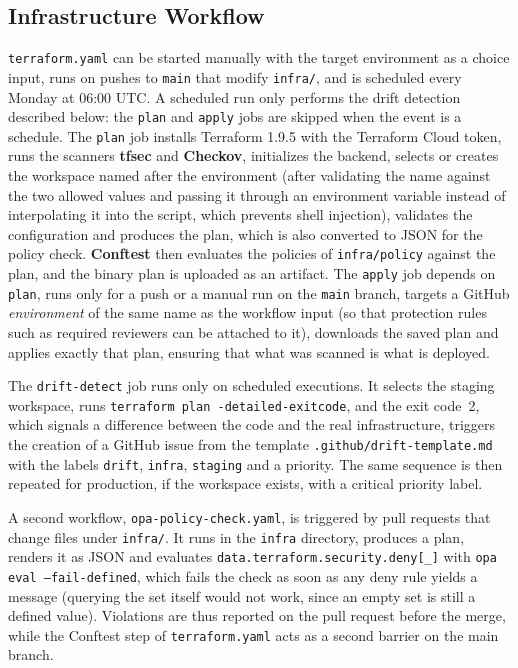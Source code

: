 \subsection{Infrastructure Workflow}

\texttt{terraform.yaml} can be started manually with the target environment as a choice input, runs on pushes to \texttt{main} that modify \texttt{infra/}, and is scheduled every Monday at 06:00 UTC. A scheduled run only performs the drift detection described below: the \texttt{plan} and \texttt{apply} jobs are skipped when the event is a schedule. The \texttt{plan} job installs Terraform 1.9.5 with the Terraform Cloud token, runs the scanners \textbf{tfsec} and \textbf{Checkov}, initializes the backend, selects or creates the workspace named after the environment (after validating the name against the two allowed values and passing it through an environment variable instead of interpolating it into the script, which prevents shell injection), validates the configuration and produces the plan, which is also converted to JSON for the policy check. \textbf{Conftest} then evaluates the policies of \texttt{infra/policy} against the plan, and the binary plan is uploaded as an artifact. The \texttt{apply} job depends on \texttt{plan}, runs only for a push or a manual run on the \texttt{main} branch, targets a GitHub \emph{environment} of the same name as the workflow input (so that protection rules such as required reviewers can be attached to it), downloads the saved plan and applies exactly that plan, ensuring that what was scanned is what is deployed.



The \texttt{drift-detect} job runs only on scheduled executions. It selects the staging workspace, runs \texttt{terraform plan -detailed-exitcode}, and the exit code~2, which signals a difference between the code and the real infrastructure, triggers the creation of a GitHub issue from the template \texttt{.github/drift-template.md} with the labels \texttt{drift}, \texttt{infra}, \texttt{staging} and a priority. The same sequence is then repeated for production, if the workspace exists, with a critical priority label.


A second workflow, \texttt{opa-policy-check.yaml}, is triggered by pull requests that change files under \texttt{infra/}. It runs in the \texttt{infra} directory, produces a plan, renders it as JSON and evaluates \texttt{data.terraform.security.deny[\_]} with \texttt{opa eval --fail-defined}, which fails the check as soon as any deny rule yields a message (querying the set itself would not work, since an empty set is still a defined value). Violations are thus reported on the pull request before the merge, while the Conftest step of \texttt{terraform.yaml} acts as a second barrier on the main branch.


